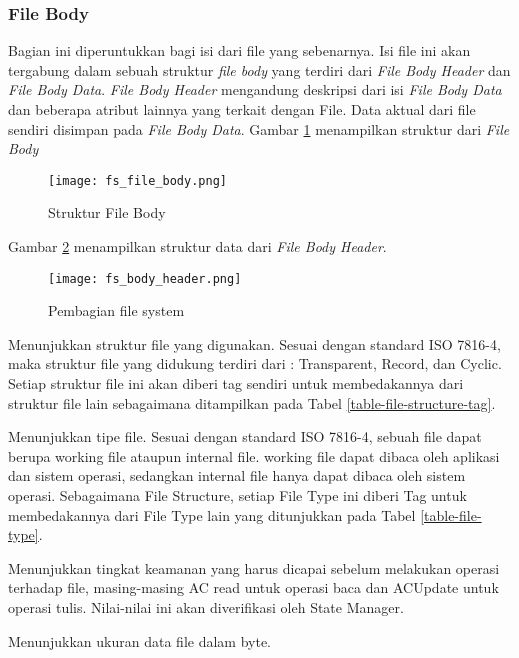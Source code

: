 \subsubsection{File Body}
\label{file-body}

Bagian ini diperuntukkan bagi isi dari file yang sebenarnya. Isi file ini akan tergabung dalam sebuah struktur {\em file body} yang terdiri dari {\em File Body Header} dan {\em File Body Data}. {\em File Body Header} mengandung deskripsi dari isi {\em File Body Data} dan beberapa atribut lainnya yang terkait dengan File. Data aktual dari file sendiri disimpan pada {\em File Body Data}. Gambar \ref{fig-body} menampilkan struktur dari {\em File Body}

\begin{figure}[h]
  \centering
  \texttt{[image: fs\_file\_body.png]} 
  \caption{Struktur File Body}
  \label{fig-body}
\end{figure}


Gambar \ref{fig-body-header} menampilkan struktur data dari {\em File Body Header}.

\begin{figure}[h]
\centering
\texttt{[image: fs\_body\_header.png]}
\caption{Pembagian file system}
\label{fig-body-header}
\end{figure}


\begin{description}[leftmargin=3cm,style=sameline]

\item[Structure] Menunjukkan struktur file yang digunakan. Sesuai dengan standard ISO 7816-4, maka struktur file yang didukung terdiri dari : Transparent, Record, dan Cyclic. Setiap struktur file ini akan diberi tag sendiri untuk membedakannya dari struktur file lain sebagaimana ditampilkan pada Tabel \ref{table-file-structure-tag}.

\item[Type] Menunjukkan tipe file. Sesuai dengan standard ISO 7816-4, sebuah file dapat berupa working file ataupun internal file. working file dapat dibaca oleh aplikasi dan sistem operasi, sedangkan internal file hanya dapat dibaca oleh sistem operasi. Sebagaimana File Structure, setiap File Type ini diberi Tag untuk membedakannya dari File Type lain yang ditunjukkan pada Tabel \ref{table-file-type}.

\item[Access cond.] Menunjukkan tingkat keamanan yang harus dicapai sebelum melakukan operasi terhadap file, masing-masing AC read untuk operasi baca dan ACUpdate untuk operasi tulis. Nilai-nilai ini akan diverifikasi oleh State Manager.

\item[Size] Menunjukkan ukuran data file dalam byte. 

\end{description}



